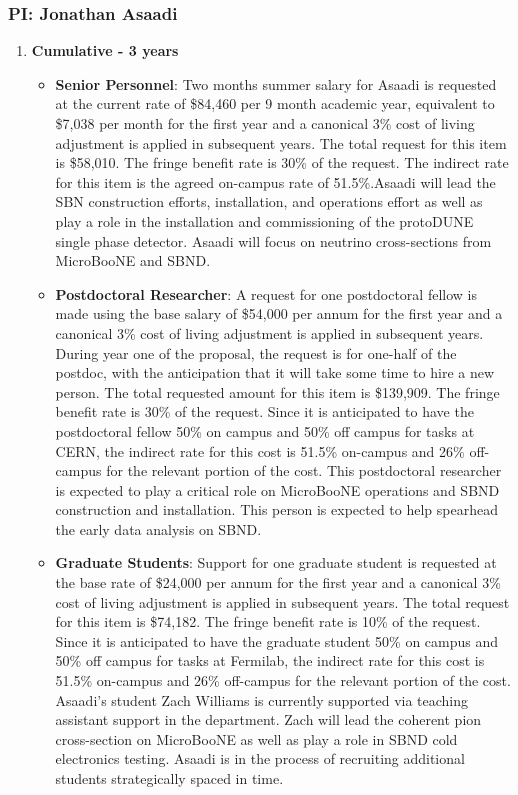 \newpage

\subsubsection{\bf PI: Jonathan Asaadi}

\begin{enumerate}

\item{\bf Cumulative - 3 years}

\begin{itemize}[noitemsep,nolistsep]
\item{{\bf Senior Personnel}: Two months summer salary for Asaadi is requested at the current rate of \$84,460 per 9 month academic year, equivalent to \$7,038 per month for the first year and a canonical 3\% cost of living adjustment is applied in subsequent years.  The total request for this item is \$58,010. The fringe benefit rate is 30\% of the request.  The indirect rate for this item is the agreed on-campus rate of 51.5\%.Asaadi will lead the SBN construction efforts, installation, and operations effort as well as play a role in the installation and commissioning of the protoDUNE single phase detector. Asaadi will focus on neutrino cross-sections from MicroBooNE and SBND.}

\item {{\bf Postdoctoral Researcher}: A request for one postdoctoral fellow is made using the base salary of \$54,000 per annum for the first year and a canonical 3\% cost of living adjustment is applied in subsequent years. During year one of the proposal, the request is for one-half of the postdoc, with the anticipation that it will take some time to hire a new person.  The total requested amount for this item is \$139,909. The fringe benefit rate is 30\% of the request.  Since it is anticipated to have the postdoctoral fellow 50\% on campus and 50\% off campus for tasks at CERN, the indirect rate for this cost is 51.5\% on-campus and 26\% off-campus for the relevant portion of the cost. This postdoctoral researcher is expected to play a critical role on MicroBooNE operations and SBND construction and installation. This person is expected to help spearhead the early data analysis on SBND.} 

\item{{\bf Graduate Students}: Support for one graduate student is requested at the base rate of \$24,000 per annum for the first year and a canonical 3\% cost of living adjustment is applied in subsequent years. The total request for this item is \$74,182.  The fringe benefit rate is 10\% of the request.  Since it is anticipated to have the graduate student 50\% on campus and 50\% off campus for tasks at Fermilab, the indirect rate for this cost is 51.5\% on-campus and 26\% off-campus for the relevant portion of the cost.   Asaadi's student Zach Williams is currently supported via teaching assistant support in the department. Zach will lead the coherent pion cross-section on MicroBooNE as well as play a role in SBND cold electronics testing.  Asaadi is in the process of recruiting additional students strategically spaced in time.}


\end{itemize}
\end{enumerate}
